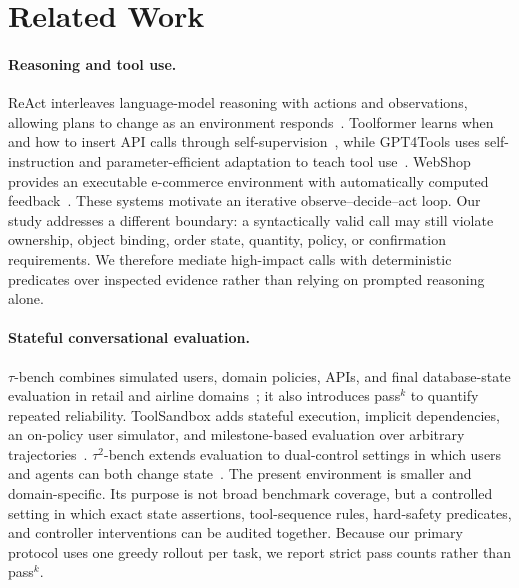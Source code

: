 \documentclass[11pt]{article}
\begin{document}
\section{Related Work}
\label{sec:related}

\paragraph{Reasoning and tool use.}
ReAct interleaves language-model reasoning with actions and observations, allowing plans to change as an environment responds~\citep{yao2023react}. Toolformer learns when and how to insert API calls through self-supervision~\citep{schick2023toolformer}, while GPT4Tools uses self-instruction and parameter-efficient adaptation to teach tool use~\citep{yang2023gpt4tools}. WebShop provides an executable e-commerce environment with automatically computed feedback~\citep{yao2022webshop}. These systems motivate an iterative observe--decide--act loop. Our study addresses a different boundary: a syntactically valid call may still violate ownership, object binding, order state, quantity, policy, or confirmation requirements. We therefore mediate high-impact calls with deterministic predicates over inspected evidence rather than relying on prompted reasoning alone.

\paragraph{Stateful conversational evaluation.}
$\tau$-bench combines simulated users, domain policies, APIs, and final database-state evaluation in retail and airline domains~\citep{yao2025taubench}; it also introduces pass$^k$ to quantify repeated reliability. ToolSandbox adds stateful execution, implicit dependencies, an on-policy user simulator, and milestone-based evaluation over arbitrary trajectories~\citep{lu2025toolsandbox}. $\tau^2$-bench extends evaluation to dual-control settings in which users and agents can both change state~\citep{barres2025tau2bench}. The present environment is smaller and domain-specific. Its purpose is not broad benchmark coverage, but a controlled setting in which exact state assertions, tool-sequence rules, hard-safety predicates, and controller interventions can be audited together. Because our primary protocol uses one greedy rollout per task, we report strict pass counts rather than pass$^k$.
\end{document}
